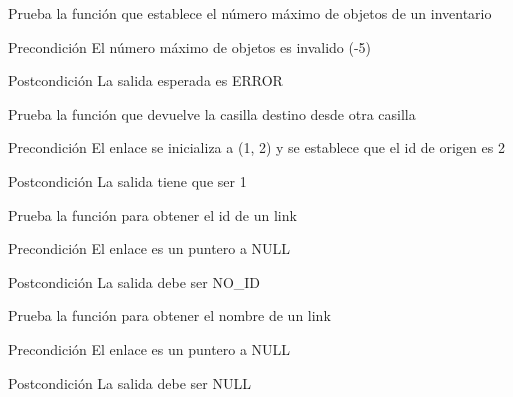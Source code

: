 \begin{DoxyRefList}
\item[\label{test__test000119}%
\hypertarget{test__test000119}{}%
Global \hyperlink{inventory__test_8c_a283a52426a084b058f3f932a47c16f7d}{test2\-\_\-inventory\-\_\-set\-\_\-max} ()]Prueba la función que establece el número máximo de objetos de un inventario \begin{DoxyPrecond}{Precondición}
El número máximo de objetos es invalido (-\/5) 
\end{DoxyPrecond}
\begin{DoxyPostcond}{Postcondición}
La salida esperada es E\-R\-R\-O\-R  
\end{DoxyPostcond}

\item[\label{test__test000155}%
\hypertarget{test__test000155}{}%
Global \hyperlink{link__test_8c_aa8a5ab06c8e9e8c6b4ef6726e9c53870}{test2\-\_\-link\-\_\-get\-\_\-dest\-\_\-from} ()]Prueba la función que devuelve la casilla destino desde otra casilla \begin{DoxyPrecond}{Precondición}
El enlace se inicializa a (1, 2) y se establece que el id de origen es 2 
\end{DoxyPrecond}
\begin{DoxyPostcond}{Postcondición}
La salida tiene que ser 1  
\end{DoxyPostcond}

\item[\label{test__test000147}%
\hypertarget{test__test000147}{}%
Global \hyperlink{link__test_8c_a0f967a1782dd7264e73ad428d22d125d}{test2\-\_\-link\-\_\-get\-\_\-id} ()]Prueba la función para obtener el id de un link \begin{DoxyPrecond}{Precondición}
El enlace es un puntero a N\-U\-L\-L 
\end{DoxyPrecond}
\begin{DoxyPostcond}{Postcondición}
La salida debe ser N\-O\-\_\-\-I\-D  
\end{DoxyPostcond}

\item[\label{test__test000145}%
\hypertarget{test__test000145}{}%
Global \hyperlink{link__test_8c_a4efc6cfcdc210e2803f9d285734c571e}{test2\-\_\-link\-\_\-get\-\_\-name} ()]Prueba la función para obtener el nombre de un link \begin{DoxyPrecond}{Precondición}
El enlace es un puntero a N\-U\-L\-L 
\end{DoxyPrecond}
\begin{DoxyPostcond}{Postcondición}
La salida debe ser N\-U\-L\-L  
\end{DoxyPostcond}


\end{DoxyRefList}
